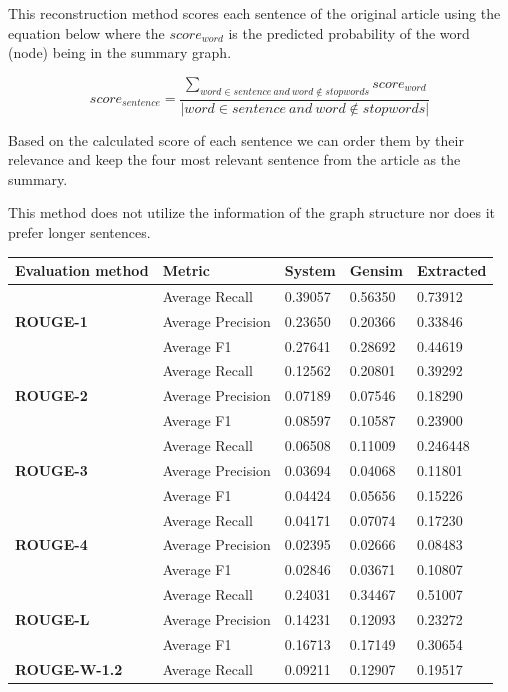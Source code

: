 This reconstruction method scores each sentence of the original article using the equation below where the \(score_{word}\) is the predicted probability of the word (node) being in the summary graph.

\[score_{sentence} = \frac{\sum_{word \in sentence\ and\ word \notin stopwords} score_{word}}{|word \in sentence\ and\ word \notin stopwords|}\]

Based on the calculated score of each sentence we can order them by their relevance and keep the four most relevant sentence from the article as the summary.

This method does not utilize the information of the graph structure nor does it prefer longer sentences.

\begin{longtable}{| l | l | l | l | l |}
	\hline
	\textbf{Evaluation method}&\textbf{Metric}&\textbf{System}&\textbf{Gensim}&\textbf{Extracted}\\ \hline \hline		
	\multirow{3}{*}{\textbf{ROUGE-1}}
		&Average Recall&0.39057&0.56350&0.73912 \\
		&Average Precision&0.23650&0.20366&0.33846 \\ 
		&Average F1&0.27641&0.28692&0.44619 \\ \hline \hline
	\multirow{3}{*}{\textbf{ROUGE-2}}
		&Average Recall&0.12562&0.20801&0.39292 \\
		&Average Precision&0.07189&0.07546&0.18290 \\
		&Average F1&0.08597&0.10587&0.23900 \\ \hline \hline
	\multirow{3}{*}{\textbf{ROUGE-3}}
		&Average Recall&0.06508&0.11009&0.246448 \\
		&Average Precision&0.03694&0.04068&0.11801 \\
		&Average F1&0.04424&0.05656&0.15226 \\ \hline \hline
	\multirow{3}{*}{\textbf{ROUGE-4}}
		&Average Recall&0.04171&0.07074&0.17230 \\
		&Average Precision&0.02395&0.02666&0.08483 \\
		&Average F1&0.02846&0.03671&0.10807 \\ \hline \hline
	\multirow{3}{*}{\textbf{ROUGE-L}}
		&Average Recall&0.24031&0.34467&0.51007 \\
		&Average Precision&0.14231&0.12093&0.23272 \\
		&Average F1&0.16713&0.17149&0.30654 \\ \hline \hline
	\multirow{3}{*}{\textbf{ROUGE-W-1.2}}
		&Average Recall&0.09211&0.12907&0.19517 \\

\end{longtable}
